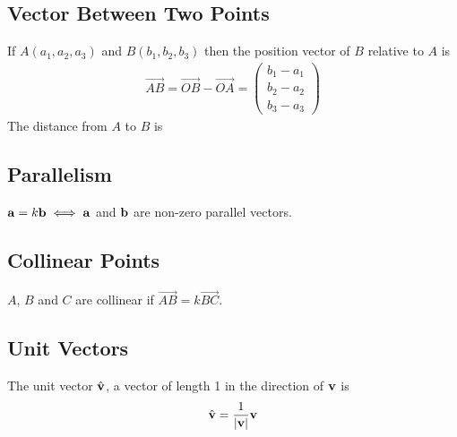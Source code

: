 \documentclass[10pt, a4paper, titlepage]{article}
\begin{document}
\begin{multicols*}{3}
	\dotfill
	\subsection{Vector Between Two Points}
	If $A(a_1,a_2,a_3)$ and $B(b_1,b_2,b_3)$ then the position vector of $B$ relative to $A$ is 
	\begin{align}
		\overrightarrow{AB}=\overrightarrow{OB}-\overrightarrow{OA}=\begin{pmatrix}b_1-a_1\\ b_2-a_2 \\b_3-a_3\end{pmatrix}
	\end{align}
	The distance from $A$ to $B$ is
	\\

	\dotfill
	\subsection{Parallelism}
	$\vb{a}=k\vb{b}\iff\vb{a}$ and $\vb{b}$ are non-zero parallel vectors.

	\dotfill
	\subsection{Collinear Points}
	$A$, $B$ and $C$ are collinear if $\overrightarrow{AB}=k\overrightarrow{BC}$.
	
	\dotfill
	\subsection{Unit Vectors}
	The unit vector $\hat{\vb{v}}$, a vector of length 1 in the direction of $\vb{v}$ is
	\begin{align}
		\hat{\vb{v}} = \frac{1}{|\vb{v}|}\vb{v}
	\end{align}


\end{multicols*}
\end{document}
